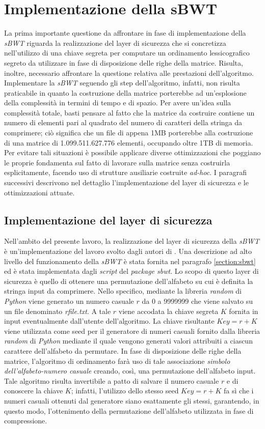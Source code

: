 \section{Implementazione della sBWT} 
La prima importante questione da affrontare in fase di implementazione della \emph{sBWT} riguarda la realizzazione del layer di sicurezza che si concretizza nell'utilizzo di una chiave segreta per computare un ordinamento lessicografico segreto da utilizzare in fase di disposizione delle righe della matrice.
Risulta, inoltre, necessario affrontare la questione relativa alle prestazioni dell'algoritmo. Implementare la \emph{sBWT} seguendo gli step dell'algoritmo, infatti, non risulta praticabile in quanto la costruzione della matrice porterebbe ad un'esplosione della complessità in termini di tempo e di spazio. Per avere un'idea sulla complessità totale, basti pensare al fatto che la matrice da costruire contiene un numero di elementi pari al quadrato del numero di caratteri della stringa da comprimere; ciò significa che un file di appena 1MB porterebbe alla costruzione di una matrice di 1.099.511.627.776 elementi, occupando oltre 1TB di memoria. Per evitare tali situazioni è possibile applicare diverse ottimizzazioni che poggiano le proprie fondamenta sul fatto di lavorare sulla matrice senza costruirla esplicitamente, facendo uso di strutture ausiliarie costruite \emph{ad-hoc}. I paragrafi successivi descrivono nel dettaglio l'implementazione del layer di sicurezza e le ottimizzazioni attuate.
\subsection{Implementazione del layer di sicurezza}
Nell'ambito del presente lavoro, la realizzazione del layer di sicurezza della \emph{sBWT} è un'implementazione del lavoro svolto dagli autori di \cite{zeng2018secure}. Una descrizione ad alto livello del funzionamento della \emph{sBWT} è stata fornita nel paragrafo \ref{section:sbwt} ed è stata implementata dagli \emph{script} del \emph{package sbwt}. Lo scopo di questo layer di sicurezza è quello di ottenere una permutazione dell'alfabeto su cui è definita la stringa input da comprimere. Nello specifico, mediante la libreria \emph{random} di \emph{Python} viene generato un numero casuale $r$ da 0 a 9999999 che viene salvato su un file denominato \emph{rfile.txt}. A tale $r$ viene accodata la chiave segreta $K$ fornita in input eventualmente dall'utente dell'algoritmo. La chiave risultante $Key=r+K$ viene utilizzata come seed per il generatore di numeri casuali fornito dalla libreria \emph{random} di \emph{Python} mediante il quale vengono generati valori attribuiti a ciascun carattere dell'alfabeto da permutare. In fase di disposizione delle righe della matrice, l'algoritmo di ordinamento farà uso di tale associazione \emph{simbolo dell'alfabeto-numero casuale} creando, così, una permutazione dell'alfabeto input. Tale algoritmo risulta invertibile a patto di salvare il numero casuale $r$ e di conoscere la chiave $K$; infatti, l'utilizzo dello stesso seed $Key=r+K$ fa sì che i numeri casuali ottenuti dal generatore siano esattamente gli stessi, garantendo, in questo modo, l'ottenimento della permutazione dell'alfabeto utilizzata in fase di compressione.

